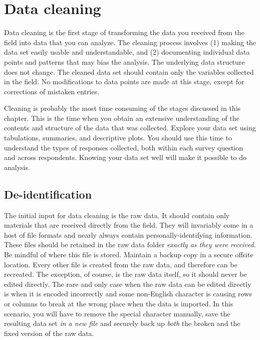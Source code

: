 
\section{Data cleaning}

Data cleaning is the first stage of transforming the data you received from the field into data that you can analyze.
The cleaning process involves (1) making the data set easily usable and understandable, 
and (2) documenting individual data points and patterns that may bias the analysis.
The underlying data structure does not change.
The cleaned data set should contain only the variables collected in the field.
No modifications to data points are made at this stage, except for corrections of mistaken entries.

Cleaning is probably the most time consuming of the stages discussed in this chapter.
This is the time when you obtain an extensive understanding of  the contents and structure of the data that was collected.
Explore your data set using tabulations, summaries, and descriptive plots.
You should use this time to understand the types of responses collected, both within each survey question and across respondents.
Knowing your data set well will make it possible to do analysis.

\subsection{De-identification}

The initial input for data cleaning is the raw data.
It should contain only materials that are received directly from the field.
They will invariably come in a host of file formats and nearly always contain personally-identifying information.
These files should be retained in the raw data folder \textit{exactly as they were received}.
Be mindful of where this file is stored. 
Maintain a backup copy in a secure offsite location.
Every other file is created from the raw data, and therefore can be recreated.
The exception, of course, is the raw data itself, so it should never be edited 
directly.
The rare and only case when the raw data can be edited directly is when it is encoded incorrectly
and some non-English character is causing rows or columns to break at the wrong place
when the data is imported. 
In this scenario, you will have to remove the special character manually, save the resulting data set \textit{in a new file} and securely back up \textit{both} the broken and the fixed version of the raw data.

